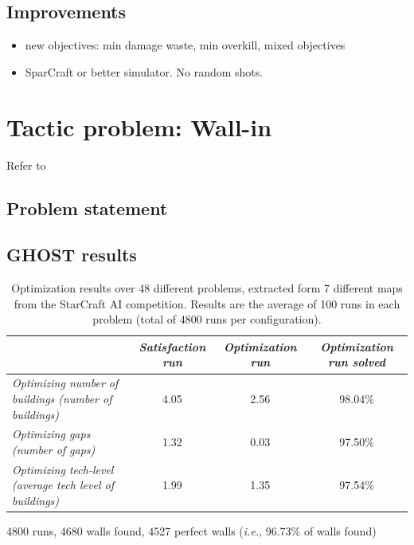 \documentclass[journal]{IEEEtran}
\newcommand{\ghost}{\textsc{GHOST}\xspace}
\newcommand{\ie}{\textit{i.e.}}
\begin{document}
\subsection{Improvements}

\begin{itemize}
\item new objectives: min damage waste, min overkill, mixed objectives
\item SparCraft or better simulator. No random shots.
\end{itemize}


\section{Tactic problem: Wall-in}\label{sec:wall}
Refer to \cite{Certicky13, RichouxUO14}
\subsection{Problem statement}
\subsection{\ghost results}

\begin{table}[h!]
    \centering
    \caption{Optimization   results   over  48   different   problems,
      extracted  form   7  different   maps  from  the   StarCraft  AI
      competition. Results are the average of 100 runs in each problem
      (total of 4800 runs per configuration).}
    \label{tab:wall}
    \begin{tabular}{|l|c|c|c|} \hline
      & {\em Satisfaction run}& {\em Optimization run}& {\em Optimization run solved} \\
      \hline
      {\em Optimizing number of buildings (number of buildings)} 	& 4.05                  & 2.56                  & 98.04\% \\ 
      {\em Optimizing gaps (number of gaps)} 				& 1.32                  & 0.03                  & 97.50\%  \\ 
      {\em Optimizing tech-level (average tech level of buildings)} 	& 1.99                  & 1.35                 & 97.54\%  \\
      \hline
    \end{tabular}  
\end{table}

4800 runs, 4680 walls found, 4527 perfect walls (\ie, 96.73\% of walls
found)
\end{document}
